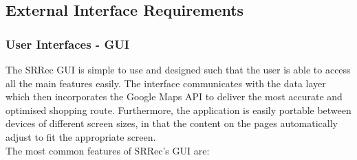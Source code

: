 \documentclass[10pt,twocolumn]{witseiepaper}
\begin{document}
		
		\subsection{External Interface Requirements}
		
		\subsubsection{User Interfaces - GUI}
		
		The SRRec GUI is simple to use and designed such that the user is able to access all the main features easily. The interface communicates with the data layer which then incorporates the Google Maps API to deliver the most accurate and optimised shopping route. Furthermore, the application is easily portable between devices of different screen sizes, in that the content on the pages automatically adjust to fit the appropriate screen.\\
		
		The most common features of SRRec's GUI are:
		
\end{document}
